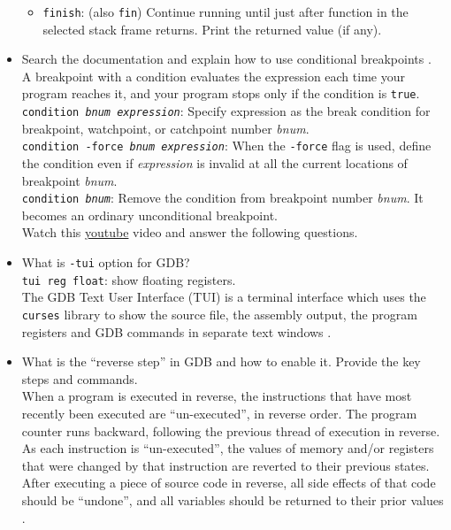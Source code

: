 \documentclass[a4paper]{article}
\begin{document}
\begin{itemize}
\begin{itemize}
        \item \texttt{finish}: (also \texttt{fin}) Continue running until just after function in the selected stack frame returns. Print the returned value (if any).
    \end{itemize}
    \item Search the documentation and explain how to use conditional breakpoints \cite{gdbum}.\\
    A breakpoint with a condition evaluates the expression each time your program reaches it, and your program stops only if the condition is \texttt{true}.\\
    \texttt{condition \textit{bnum expression}}: Specify expression as the break condition for breakpoint, watchpoint, or catchpoint number \textit{bnum}.\\
    \texttt{condition -force \textit{bnum expression}}: When the \texttt{-force} flag is used, define the condition even if \textit{expression} is invalid at all the current locations of breakpoint \textit{bnum}.\\
    \texttt{condition \textit{bnum}}: Remove the condition from breakpoint number \textit{bnum}. It becomes an ordinary unconditional breakpoint.\\
    Watch this \href{https://www.youtube.com/watch?v=PorfLSr3DDI}{youtube} video and answer the following questions.
    \item What is \texttt{-tui} option for GDB?\\
    \texttt{tui reg float}: show floating registers.\\
    The GDB Text User Interface (TUI) is a terminal interface which uses the \texttt{curses} library to show the source file, the assembly output, the program registers and GDB commands in separate text windows \cite{tui}.
    \item What is the “reverse step” in GDB and how to enable it. Provide the key steps and commands.\\
    When a program is executed in reverse, the instructions that have most recently been executed are “un-executed”, in reverse order. The program counter runs backward, following the previous thread of execution in reverse. As each instruction is “un-executed”, the values of memory and/or registers that were changed by that instruction are reverted to their previous states. After executing a piece of source code in reverse, all side effects of that code should be “undone”, and all variables should be returned to their prior values \cite{reverse}.\\

\end{itemize}
\end{document}
